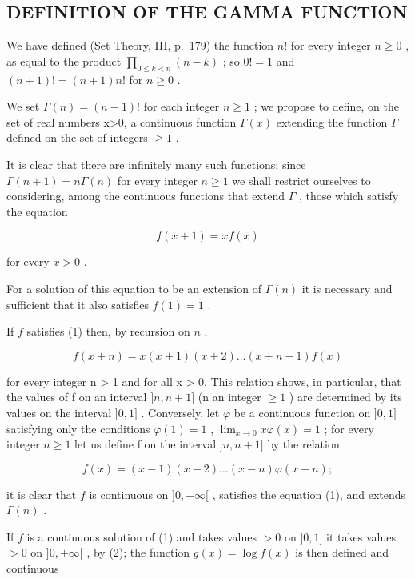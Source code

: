 \subsection{DEFINITION OF THE GAMMA FUNCTION}

We have defined (Set Theory, III, p.~179) the function \(n!\) for every integer \(n \geqslant 0\) , as equal to the product \(\prod_{0 \leqslant k < n} (n - k)\) ; so \(0! = 1\) and \((n + 1)! = (n + 1)n!\) for \(n \geqslant 0\) .

We set \(\Gamma(n)=(n-1)!\) for each integer \(n\geqslant1\) ; we propose to define, on the set of real numbers x\textgreater0, a continuous function \(\Gamma(x)\) extending the function \(\Gamma\) defined on the set of integers \(\geqslant1\) .

It is clear that there are infinitely many such functions; since \(\Gamma(n+1)=n\Gamma(n)\) for every integer \(n\geqslant1\) we shall restrict ourselves to considering, among the continuous functions that extend \(\Gamma\) , those which satisfy the equation

\[
f (x + 1) = x f (x)\tag{1}
\]

for every \(x > 0\) .

For a solution of this equation to be an extension of \(\Gamma(n)\) it is necessary and sufficient that it also satisfies \(f(1) = 1\) .

If \(f\) satisfies (1) then, by recursion on \(n\) ,

\[
f (x + n) = x (x + 1) (x + 2) \dots (x + n - 1) f (x)\tag{2}
\]

for every integer n \textgreater{} 1 and for all x \textgreater{} 0. This relation shows, in particular, that the values of f on an interval \(]n, n + 1]\) (n an integer \(\geqslant 1\) ) are determined by its values on the interval \(]0, 1]\) . Conversely, let \(\varphi\) be a continuous function on \(]0, 1]\) satisfying only the conditions \(\varphi(1) = 1\) , \(\lim_{x \to 0} x \varphi(x) = 1\) ; for every integer \(n \geqslant 1\) let us define f on the interval \(]n, n + 1]\) by the relation

\[
f (x) = (x - 1) (x - 2) \dots (x - n) \varphi (x - n);
\]

it is clear that \(f\) is continuous on \(]0, +\infty[\) , satisfies the equation (1), and extends \(\Gamma(n)\) .

If \(f\) is a continuous solution of (1) and takes values \(> 0\) on \(]0, 1]\) it takes values \(> 0\) on \(]0, +\infty[\) , by (2); the function \(g(x) = \log f(x)\) is then defined and continuous

